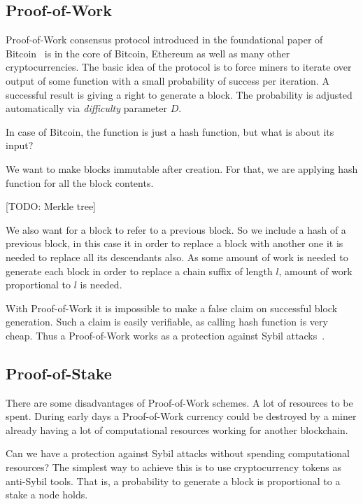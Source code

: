 \documentclass[]{report}   %
\begin{document}
\subsection{Proof-of-Work}

Proof-of-Work consensus protocol introduced in the foundational paper of Bitcoin~\cite{Nakamoto2008} is in the core of Bitcoin, Ethereum as well as many other cryptocurrencies. The basic idea of the protocol is to force miners to iterate over output of some function with a small probability of success per iteration. A successful result is giving a right to generate a block. The probability is adjusted automatically via \textit{difficulty} parameter \(D\). 

In case of Bitcoin, the function is just a hash function, but what is about its input? 

We want to make blocks immutable after creation. For that, we are applying hash function for all the block contents. 

[TODO: Merkle tree]

We also want for a block to refer to a previous block. So we include a hash of a previous block, in this case it in order to replace a block with another one it is needed to replace all its descendants also. As some amount of work is needed to generate each block in order to replace a chain suffix of length \(l\), amount of work proportional to \(l\) is needed.

With Proof-of-Work it is impossible to make a false claim on successful block generation. Such a claim is easily verifiable, as calling hash function is very cheap. Thus a Proof-of-Work works as a protection against Sybil attacks~\cite{}.

\subsection{Proof-of-Stake}

There are some disadvantages of Proof-of-Work schemes. A lot of resources to be spent. During early days a Proof-of-Work currency could be destroyed by a miner already having a lot of computational resources working for another blockchain. 

Can we have a protection against Sybil attacks without spending computational resources? The simplest way to achieve this is to use cryptocurrency tokens as anti-Sybil tools. That is, a probability to generate a block is proportional to a stake a node holds. 
\end{document}
